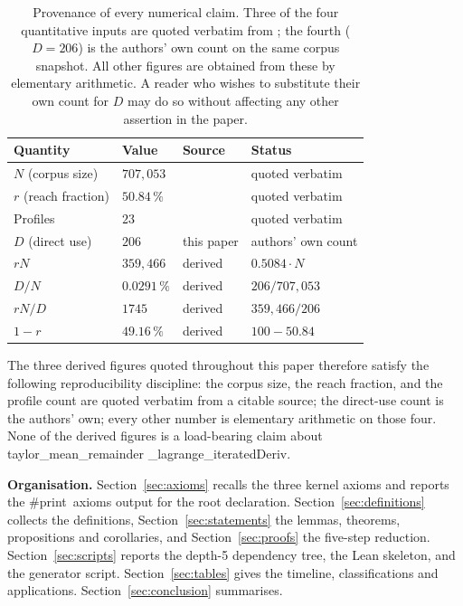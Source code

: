 \documentclass[11pt,reqno]{amsart}
\begin{document}
\begin{table}[]
\centering
{} 
\begin{tabular}{|l|l|l|l|}
\hline
\textbf{Quantity} & \textbf{Value} & \textbf{Source} & \textbf{Status} \\ 
\hline
$N$ (corpus size) & $707{,}053$ & \cite{close2026axiom} & quoted verbatim \\ 
$r$ (reach fraction) & $50.84\,\%$ & \cite{close2026axiom} & quoted verbatim
\\ 
Profiles & $23$ & \cite{close2026axiom} & quoted verbatim \\ 
$D$ (direct use) & $206$ & this paper & authors' own count \\ 
$rN$ & $359{,}466$ & derived & $0.5084 \cdot N$ \\ 
$D/N$ & $0.0291\,\%$ & derived & $206 / 707{,}053$ \\ 
$rN/D$ & $1745$ & derived & $359{,}466 / 206$ \\ 
$1-r$ & $49.16\,\%$ & derived & $100 - 50.84$ \\ \hline
\end{tabular}
\medskip
\caption{ Provenance of every numerical claim. Three of the
four quantitative inputs are quoted verbatim from \protect\cite%
{close2026axiom}; the fourth ($D=206$) is the authors' own count on the same
corpus snapshot. All other figures are obtained from these by elementary
arithmetic. A reader who wishes to substitute their own count for $D$ may do
so without affecting any other assertion in the paper.}
\label{tab:provenance}
\end{table}

\noindent The three derived figures quoted throughout this paper therefore
satisfy the following reproducibility discipline: the corpus size, the reach
fraction, and the profile count are quoted verbatim from a citable source;
the direct-use count is the authors' own; every other number is elementary
arithmetic on those four. None of the derived figures is a load-bearing
claim about \textsf{taylor\allowbreak\_mean\allowbreak\_remainder\allowbreak%
\_lagrange\allowbreak \_iterated\allowbreak Deriv}.

\smallskip\noindent\textbf{Organisation.} Section~\ref{sec:axioms} recalls
the three kernel axioms and reports the \textsf{\#print\ axioms} output for
the root declaration. Section~\ref{sec:definitions} collects the
definitions, Section~\ref{sec:statements} the lemmas, theorems, propositions
and corollaries, and Section~\ref{sec:proofs} the five-step reduction.
Section~\ref{sec:scripts} reports the depth-5 dependency tree, the Lean
skeleton, and the generator script. Section~\ref{sec:tables} gives the
timeline, classifications and applications. Section~\ref{sec:conclusion}
summarises.
\end{document}
